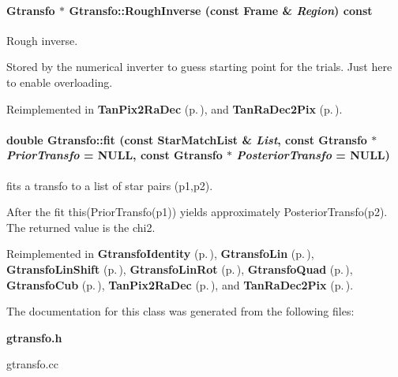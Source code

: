 \paragraph{\setlength{\rightskip}{0pt plus 5cm}Gtransfo $\ast$ Gtransfo::Rough\-Inverse (const {\bf Frame} \& {\em Region}) const\hspace{0.3cm}{\tt  [virtual]}}\hfill\label{class_gtransfo_a13}


Rough inverse.

Stored by the numerical inverter to guess starting point  for the trials. Just here to enable overloading. 

Reimplemented in {\bf Tan\-Pix2Ra\-Dec} {\rm (p.\,\pageref{class_tanpix2radec_a8})}, and {\bf Tan\-Ra\-Dec2Pix} {\rm (p.\,\pageref{class_tanradec2pix_a6})}.
\paragraph{\setlength{\rightskip}{0pt plus 5cm}double Gtransfo::fit (const Star\-Match\-List \& {\em List}, const Gtransfo $\ast$ {\em Prior\-Transfo} = NULL, const Gtransfo $\ast$ {\em Posterior\-Transfo} = NULL)\hspace{0.3cm}{\tt  [pure virtual]}}\hfill\label{class_gtransfo_a4}


fits a transfo to a list of star pairs (p1,p2).

After the fit this(Prior\-Transfo(p1)) yields approximately Posterior\-Transfo(p2). The returned value is the chi2. 

Reimplemented in {\bf Gtransfo\-Identity} {\rm (p.\,\pageref{class_gtransfoidentity_a2})}, {\bf Gtransfo\-Lin} {\rm (p.\,\pageref{class_gtransfolin_a9})}, {\bf Gtransfo\-Lin\-Shift} {\rm (p.\,\pageref{class_gtransfolinshift_a2})}, {\bf Gtransfo\-Lin\-Rot} {\rm (p.\,\pageref{class_gtransfolinrot_a2})}, {\bf Gtransfo\-Quad} {\rm (p.\,\pageref{class_gtransfoquad_a5})}, {\bf Gtransfo\-Cub} {\rm (p.\,\pageref{class_gtransfocub_a6})}, {\bf Tan\-Pix2Ra\-Dec} {\rm (p.\,\pageref{class_tanpix2radec_a17})}, and {\bf Tan\-Ra\-Dec2Pix} {\rm (p.\,\pageref{class_tanradec2pix_a10})}.

The documentation for this class was generated from the following files:\begin{CompactItemize}
\item 
{\bf gtransfo.h}\item 
gtransfo.cc\end{CompactItemize}
